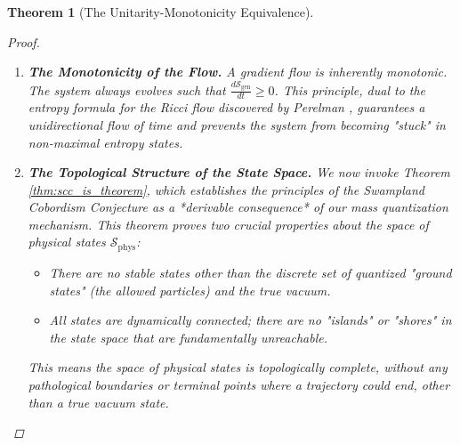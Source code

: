 \documentclass[11pt, letterpaper]{report}
\theoremstyle{plain} %
\newtheorem{theorem}{Theorem}[chapter]
\theoremstyle{definition} %
\theoremstyle{remark} %
\begin{document}
\begin{theorem}[The Unitarity-Monotonicity Equivalence]
\begin{proof}
\begin{enumerate}
    \item \textbf{The Monotonicity of the Flow.}
    A gradient flow is inherently monotonic. The system always evolves such that $\frac{d\mathcal{S}_{\text{gen}}}{dt} \ge 0$. This principle, dual to the entropy formula for the Ricci flow discovered by Perelman \cite{Perelman2002}, guarantees a unidirectional flow of time and prevents the system from becoming "stuck" in non-maximal entropy states.

    \item \textbf{The Topological Structure of the State Space.}
    We now invoke Theorem \ref{thm:scc_is_theorem}, which establishes the principles of the Swampland Cobordism Conjecture as a *derivable consequence* of our mass quantization mechanism. This theorem proves two crucial properties about the space of physical states $\mathcal{S}_{\text{phys}}$:
    \begin{itemize}
        \item There are no stable states other than the discrete set of quantized "ground states" (the allowed particles) and the true vacuum.
        \item All states are dynamically connected; there are no "islands" or "shores" in the state space that are fundamentally unreachable.
    \end{itemize}
    This means the space of physical states is topologically complete, without any pathological boundaries or terminal points where a trajectory could end, other than a true vacuum state.


\end{enumerate}
\end{proof}
\end{theorem}
\end{document}
